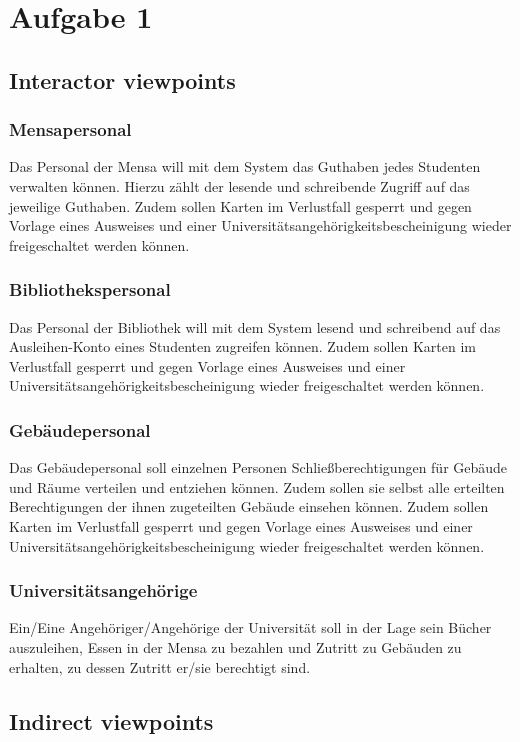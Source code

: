 \chapter*{Aufgabe 1}
    \section*{Interactor viewpoints}
        \subsection*{Mensapersonal}
            Das Personal der Mensa will mit dem System das Guthaben jedes Studenten verwalten können. Hierzu zählt der lesende und schreibende Zugriff auf das jeweilige Guthaben. Zudem sollen Karten im Verlustfall gesperrt und gegen Vorlage eines Ausweises und einer Universitätsangehörigkeitsbescheinigung wieder freigeschaltet werden können. 
            
        \subsection*{Bibliothekspersonal}
            Das Personal der Bibliothek will mit dem System lesend und schreibend auf das Ausleihen-Konto eines Studenten zugreifen können. Zudem sollen Karten im Verlustfall gesperrt und gegen Vorlage eines Ausweises und einer Universitätsangehörigkeitsbescheinigung wieder freigeschaltet werden können.
        \subsection*{Gebäudepersonal} 
            Das Gebäudepersonal soll einzelnen Personen Schließberechtigungen für Gebäude und Räume verteilen und entziehen können. Zudem sollen sie selbst alle erteilten Berechtigungen der ihnen zugeteilten Gebäude einsehen können. Zudem sollen Karten im Verlustfall gesperrt und gegen Vorlage eines Ausweises und einer Universitätsangehörigkeitsbescheinigung wieder freigeschaltet werden können.
        \subsection*{Universitätsangehörige}
            Ein/Eine Angehöriger/Angehörige der Universität soll in der Lage sein Bücher auszuleihen, Essen in der Mensa zu bezahlen und Zutritt zu Gebäuden zu erhalten, zu dessen Zutritt er/sie berechtigt sind.
        
    \section*{Indirect viewpoints}

